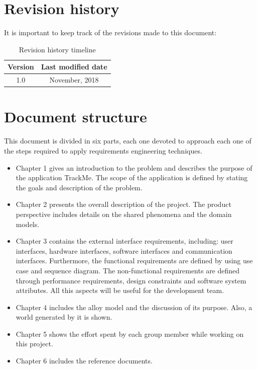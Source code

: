 \documentclass[hidelinks, 12pt]{report}
\begin{document}
	\section{Revision history}
	It is important to keep track of the revisions made to this document: \\
	
	\begin{table}[h]
		\centering
		\begin{tabular}{c c}
			\hline\hline
			\textbf{Version} & \textbf{Last modified date} \\ [0.5ex]
			\hline
			1.0 &  \nth{11} November, 2018  \\
			\hline
		\end{tabular}
		\caption{Revision history timeline}
		\label{fig:Revision history}
	\end{table}
	
	\section{Document structure}
	This document is divided in six parts, each one devoted to approach each one of the steps required to apply requirements engineering techniques.
	\begin{itemize}
		\item Chapter 1 gives an introduction to the problem and describes the purpose of the application TrackMe. The scope of the application is defined by stating the goals and description of the problem.
		\item Chapter 2 presents the overall description of the project. The product perspective includes details on the shared phenomena and the domain models.
		\item Chapter 3 contains the external interface requirements, including: user interfaces, hardware interfaces, software interfaces and communication interfaces. Furthermore, the functional requirements are defined by using use case and sequence diagram. The non-functional requirements are defined through performance requirements, design constraints and software system attributes. All this aspects will be useful for the development team.
		\item Chapter 4 includes the alloy model and the discussion of its purpose. Also, a world generated by it is shown.
		\item Chapter 5 shows the effort spent by each group member while working on this project.
		\item Chapter 6 includes the reference documents.
	\end{itemize}
	
\end{document}
